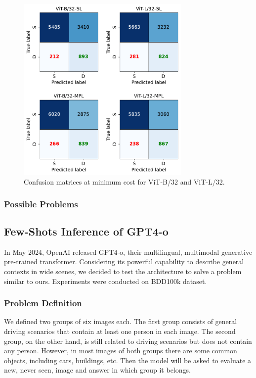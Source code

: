 \begin{figure}
    \centering
    \includegraphics[width=0.75\textwidth]{images/bdd100k/training/confusion-matrix_min_cost.pdf}
    \caption{Confusion matrices at minimum cost for ViT-B/32 and ViT-L/32.}
\end{figure}

\subsubsection{Possible Problems}

\subsection{Few-Shots Inference of GPT4-o}
In May 2024, OpenAI released GPT4-o, their multilingual, multimodal generative 
pre-trained transformer. Considering its powerful capability to describe general 
contexts in wide scenes, we decided to test the architecture to solve a problem 
similar to ours. Experiments were conducted on BDD100k dataset.

\subsubsection{Problem Definition}
We defined two groups of six images each. The first group consists of general 
driving scenarios that contain at least one person in each image. 
The second group, on the other hand, is still related to driving scenarios but 
does not contain any person. However, in most images of both groups there are 
some common objects, including cars, buildings, etc.
Then the model will be asked to evaluate a new, never seen, image and answer 
in which group it belongs.

